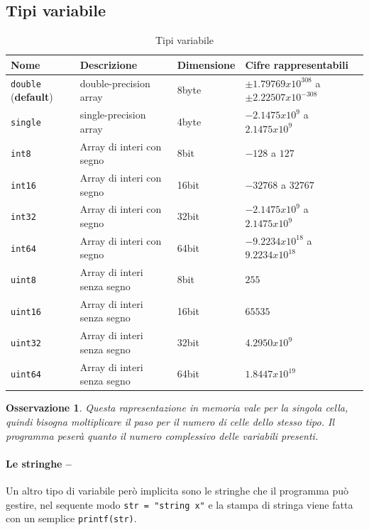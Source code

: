 \documentclass{book}
\newtheorem{oss}{Osservazione}[section]
\begin{document}
\subsection{Tipi variabile}
\label{sec:tipivariabile}

\begin{table}[ht]
  \centering
  \begin{tabular}{llll}
    {\bf Nome} & {\bf Descrizione} & {\bf Dimensione} & {\bf Cifre rappresentabili}\\\hline
    \lstinline|double| ({\bf default}) & double-precision array & 8byte & $\pm1.79769x10^{308}$ a $\pm2.22507x10^{-308}$\\\hline
    \lstinline|single| & single-precision array & 4byte & $-2.1475x10^9$ a $2.1475x10^9$\\\hline 
    \lstinline|int8| & Array di interi con segno & 8bit & $-128$ a $127$\\\hline
    \lstinline|int16| & Array di interi con segno & 16bit & $-32768$ a $32767$ \\\hline
    \lstinline|int32| & Array di interi con segno & 32bit & $-2.1475x10^9$ a $2.1475x10^9$\\\hline 
    \lstinline|int64| & Array di interi con segno & 64bit & $-9.2234x10^{18}$ a $9.2234x10^{18}$\\\hline
    \lstinline|uint8| & Array di interi senza segno & 8bit & $255$\\\hline
    \lstinline|uint16| & Array di interi senza segno & 16bit & $65535$ \\\hline
    \lstinline|uint32| & Array di interi senza segno & 32bit & $4.2950x10^9$\\\hline 
    \lstinline|uint64| & Array di interi senza segno & 64bit & $1.8447x10^{19}$\\\hline
  \end{tabular}
  \caption{Tipi variabile}
  \label{tab:tipivariabile}
\end{table}
\begin{oss}
  Questa rapresentazione in memoria vale per la singola cella, quindi bisogna
  moltiplicare il paso per il numero di celle dello stesso tipo. Il programma
  peserà quanto il numero complessivo delle variabili presenti.
\end{oss}

\paragraph{Le stringhe --}
Un altro tipo di variabile però implicita sono le stringhe che il programma può
gestire, nel sequente modo \lstinline|str = "string x"| e la stampa di stringa
viene fatta con un semplice \lstinline|printf(str)|.
\clearpage
\end{document}
